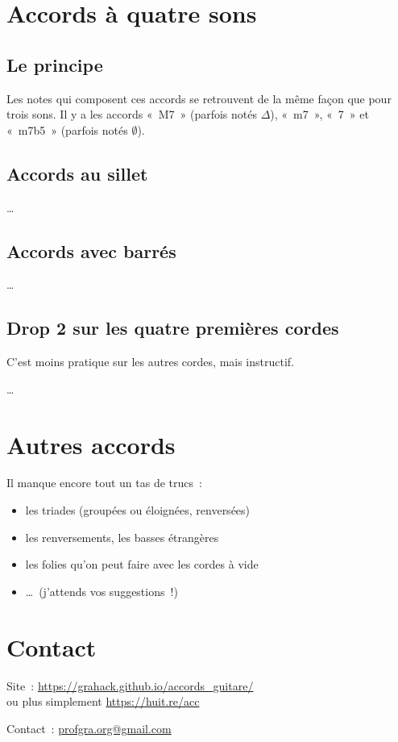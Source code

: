 \documentclass[11pt]{article}
\begin{document}
\section{Accords à quatre sons}

\subsection{Le principe}

Les notes qui composent ces accords se retrouvent de la même façon que pour
trois sons. Il y a les accords «~M7~» (parfois notés $\Delta$), «~m7~», «~7~»
et «~m7b5~» (parfois notés $\emptyset$).

\subsection{Accords au sillet}

\ldots

\subsection{Accords avec barrés}

\ldots

\subsection{Drop 2 sur les quatre premières cordes}

C’est moins pratique sur les autres cordes, mais instructif.

\ldots

\section{Autres accords}


Il manque encore tout un tas de trucs~:

\begin{itemize}
\item les triades (groupées ou éloignées, renversées)
\item les renversements, les basses étrangères
\item les folies qu’on peut faire avec les cordes à vide
\item \ldots~(j’attends vos suggestions~!)
\end{itemize}

\section{Contact} \label{contact}

\setlength{\parindent}{0pt}

Site~: \url{https://grahack.github.io/accords_guitare/} \\
ou plus simplement \url{https://huit.re/acc}

Contact~: \url{profgra.org@gmail.com}
\end{document}
